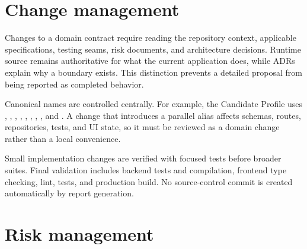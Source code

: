 \section{Change management}

Changes to a domain contract require reading the repository context, applicable specifications, testing seams, risk documents, and architecture decisions. Runtime source remains authoritative for what the current application does, while ADRs explain why a boundary exists. This distinction prevents a detailed proposal from being reported as completed behavior.

Canonical names are controlled centrally. For example, the Candidate Profile uses , , , , , , , , and . A change that introduces a parallel alias affects schemas, routes, repositories, tests, and UI state, so it must be reviewed as a domain change rather than a local convenience.

Small implementation changes are verified with focused tests before broader suites. Final validation includes backend tests and compilation, frontend type checking, lint, tests, and production build. No source-control commit is created automatically by report generation.

\section{Risk management}

